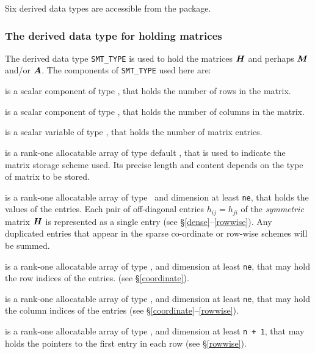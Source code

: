 \documentclass{galahad}
\begin{document}
\galtypes
Six derived data types are accessible from the package.


\subsubsection{The derived data type for holding matrices}\label{typesmt}
The derived data type {\tt SMT\_TYPE} is used to hold the matrices ${\bm{H}}$
and perhaps ${\bm{M}}$ and/or ${\bm{A}}$.
The components of {\tt SMT\_TYPE} used here are:

\begin{description}

 is a scalar component of type \integer,
that holds the number of rows in the matrix.

 is a scalar component of type \integer,
that holds the number of columns in the matrix.

 is a scalar variable of type \integer, that
holds the number of matrix entries.

 is a rank-one allocatable array of type default \character, that
is used to indicate the matrix storage scheme used. Its precise length and
content depends on the type of matrix to be stored.

 is a rank-one allocatable array of type \realdp\,
and dimension at least {\tt ne}, that holds the values of the entries.
Each pair of off-diagonal entries $h_{ij} = h_{ji}$ of the {\em symmetric}
matrix ${\bm{H}}$ is represented as a single entry
(see \S\ref{dense}--\ref{rowwise}).
Any duplicated entries that appear in the sparse
co-ordinate or row-wise schemes will be summed.

 is a rank-one allocatable array of type \integer,
and dimension at least {\tt ne}, that may hold the row indices of the entries.
(see \S\ref{coordinate}).

 is a rank-one allocatable array of type \integer,
and dimension at least {\tt ne}, that may hold the column indices of the entries
(see \S\ref{coordinate}--\ref{rowwise}).

 is a rank-one allocatable array of type \integer,
and dimension at least {\tt n + 1}, that may holds the pointers to
the first entry in each row (see \S\ref{rowwise}).

\end{description}

\end{document}
